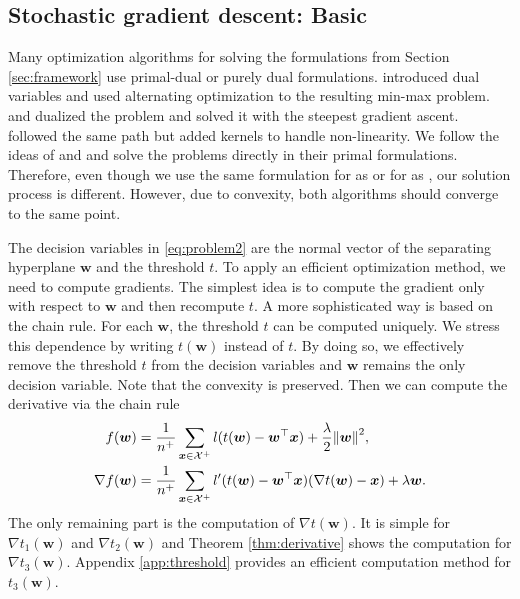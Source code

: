 \subsection{Stochastic gradient descent: Basic}

Many optimization algorithms for solving the formulations from Section \ref{sec:framework} use primal-dual or purely dual formulations. \cite{eban2017scalable} introduced dual variables and used alternating optimization to the resulting min-max problem.  \cite{li2014top} and \cite{zhang2018tau} dualized the problem and solved it with the steepest gradient ascent. \cite{macha2020nonlinear} followed the same path but added kernels to handle non-linearity. We follow the ideas of \cite{mackey2018constrained} and \cite{adam2019machine} and solve the problems directly in their primal formulations. Therefore, even though we use the same formulation for \TopPush as \cite{li2014top} or for \tauFPL as \cite{zhang2018tau}, our solution process is different. However, due to convexity, both algorithms should converge to the same point.

The decision variables in \eqref{eq:problem2} are the normal vector of the separating hyperplane $\bm{w}$ and the threshold $t$. To apply an efficient optimization method, we need to compute gradients. The simplest idea \cite{grill2016learning} is to compute the gradient only with respect to $\bm{w}$ and then recompute $t$. A more sophisticated way is based on the chain rule. For each $\bm{w}$, the threshold $t$ can be computed uniquely. We stress this dependence by writing $t(\bm{w})$ instead of $t$. By doing so, we effectively remove the threshold $t$ from the decision variables and $\bm{w}$ remains the only decision variable. Note that the convexity is preserved. Then we can compute the derivative via the chain rule
\begin{equation}\label{eq:derivatives}
  \begin{aligned}
  f(\bm{w}) & = \frac{1}{n^+}\sum_{\bm{x} \in \Xc^+} l(t(\bm{w}) - \bm{w}^\top \bm{x}) + \frac{\lambda}{2}\norm{\bm{w}}^2, \\
  \nabla f(\bm{w}) & = \frac{1}{n^+}\sum_{\bm{x} \in \Xc^+} l'(t(\bm{w}) - \bm{w}^\top \bm{x})(\nabla t(\bm{w}) - \bm{x}) + \lambda \bm{w}.
  \end{aligned}
\end{equation}
The only remaining part is the computation of $\nabla t(\bm{w})$. It is simple for $\nabla t_1(\bm{w})$ and $\nabla t_2(\bm{w})$ and Theorem \ref{thm:derivative} shows the computation for $\nabla t_3(\bm{w})$. Appendix \ref{app:threshold} provides an efficient computation method for $t_3(\bm{w})$.

